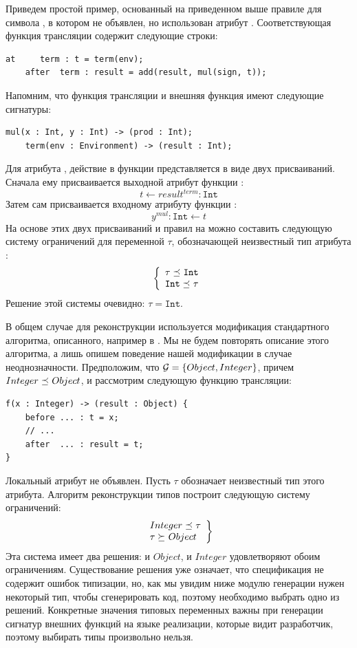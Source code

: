 Приведем простой пример, основанный на приведенном выше правиле для символа , в котором не объявлен, но использован атрибут . Соответствующая функция трансляции содержит следующие строки:
\begin{lstlisting}[language=Grammatic]
	at     term : t = term(env);
	after  term : result = add(result, mul(sign, t));
\end{lstlisting}
Напомним, что функция трансляции  и внешняя функция  имеют следующие сигнатуры:
\begin{lstlisting}[language=Grammatic]
	mul(x : Int, y : Int) -> (prod : Int);
	term(env : Environment) -> (result : Int);
\end{lstlisting}
Для атрибута , действие в функции  представляется в виде двух присваиваний. Сначала ему присваивается выходной атрибут функции :
\begin{equation}\label{teqres}
		t \leftarrow result^{term} : \mathtt{Int}
\end{equation}
Затем сам  присваивается входному атрибуту  функции :
\begin{equation}\label{yeqt}
		y^{mul} : \mathtt{Int} \leftarrow t
\end{equation}
На основе этих двух присваиваний и правил на  можно составить следующую систему ограничений для переменной $\tau$, обозначающей неизвестный тип атрибута :
$$
	\left\{\begin{array}{l}%
		\tau \lel \mathtt{Int}\\
		\mathtt{Int} \lel \tau\\
	\end{array}\right.
$$
Решение этой системы очевидно: $\tau = \mathtt{Int}$.

В общем случае для реконструкции используется модификация стандартного алгоритма, описанного, например в \cite{Pierce}. Мы не будем повторять описание этого алгоритма, а лишь опишем поведение нашей модификации в случае неоднозначности. Предположим, что ${\mathcal{G}_{}} = \{Object, Integer\}$, причем $Integer \preceq_{} Object$, и рассмотрим следующую функцию трансляции:
\begin{lstlisting}[language=Grammatic]
f(x : Integer) -> (result : Object) {
	before ... : t = x;
	// ...
	after  ... : result = t;
}
\end{lstlisting}
Локальный атрибут  не объявлен. Пусть $\tau$ обозначает неизвестный тип этого атрибута. Алгоритм реконструкции типов построит следующую систему ограничений:
$$\left.\begin{array}{l}
Integer \preceq_{} \tau\\
\tau \succeq_{} Object\\
\end{array}\right\}$$
Эта система имеет два решения: и $Object$, и $Integer$ удовлетворяют обоим ограничениям. Существование решения уже означает, что спецификация не содержит ошибок типизации, но, как мы увидим ниже модулю генерации нужен некоторый тип, чтобы сгенерировать код, поэтому необходимо выбрать одно из решений.
Конкретные значения типовых переменных важны при генерации сигнатур внешних функций на языке реализации, которые видит разработчик, поэтому выбирать типы произвольно нельзя.

